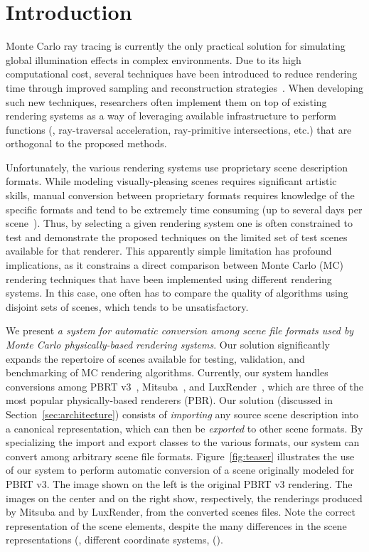 \section{Introduction}
\label{sec:introduction}

Monte Carlo ray tracing is currently the only practical solution for simulating global illumination effects in complex environments.
Due to its high computational cost, several techniques have been introduced to reduce rendering time through improved sampling and reconstruction strategies~\cite{X, Y, Z}. When developing such new techniques, researchers often implement them on top of existing rendering systems as a way of leveraging available infrastructure to perform functions (\eg, ray-traversal acceleration, ray-primitive intersections, etc.) that are orthogonal to the proposed methods.

Unfortunately, the various rendering systems use proprietary scene description formats. While modeling visually-pleasing scenes requires significant artistic skills, manual conversion between proprietary formats requires knowledge of the specific formats and tend to be extremely time consuming (up to several days per scene~\cite{Bitterli}). 
Thus, by selecting a given rendering system one is often constrained to test and demonstrate the proposed techniques on the limited set of test scenes available for that renderer. This apparently simple limitation has profound implications, as it constrains a direct comparison between Monte Carlo (MC) rendering techniques that have been implemented using different rendering systems. In this case, one often has to compare the quality of algorithms using disjoint sets of scenes, which tends to be unsatisfactory.    
    
We present {\it a system for automatic conversion among scene file formats used by Monte Carlo physically-based rendering systems}. 
Our solution significantly expands the repertoire of scenes available for testing, validation, and benchmarking of MC rendering algorithms.  
Currently, our system handles conversions among PBRT v3~\cite{PBRT-v3}, Mitsuba~\cite{mitsuba}, and LuxRender~\cite{luxrender}, which are three of the most popular physically-based renderers (PBR). Our solution (discussed in Section~\ref{sec:architecture}) consists of {\it importing} any source scene description into a canonical representation, which can then be {\it exported} to other scene formats. By specializing the import and export classes to the various formats, our system can convert among arbitrary scene file formats.     
%
Figure~\ref{fig:teaser} illustrates the use of our system to perform automatic conversion of a scene originally modeled for PBRT v3. The image shown on the left is the original PBRT v3 rendering. The images on the center and on the right show, respectively, the renderings produced by Mitsuba and by LuxRender, from the converted scenes files. Note the correct representation of the scene elements, despite the many differences in the scene representations (\eg, different coordinate systems, ().

